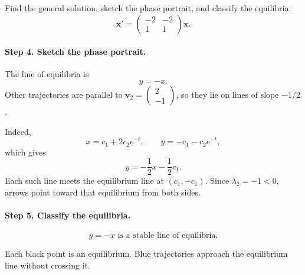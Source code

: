 \documentclass[10pt,letterpaper]{article}
\begin{document}
\begin{example}[5]{
Find the general solution, sketch the phase portrait,
and classify the equilibria:
\[
\mathbf{x}'=
\begin{pmatrix}
-2&-2\\
1&1
\end{pmatrix}\mathbf{x}.
\]
}
\paragraph{Step 4. Sketch the phase portrait.}
The line of equilibria is
\[
y=-x.
\]
Other trajectories are parallel to
$\mathbf{v}_2=\begin{pmatrix}2\\-1\end{pmatrix}$,
so they lie on lines of slope $-1/2$.

Indeed,
\[
x=c_1+2c_2e^{-t},
\qquad
y=-c_1-c_2e^{-t},
\]
which gives
\[
y=-\frac12x-\frac12c_1.
\]
Each such line meets the equilibrium line at
$(c_1,-c_1)$. Since $\lambda_2=-1<0$, arrows point
toward that equilibrium from both sides.

\paragraph{Step 5. Classify the equilibria.}
\[
\boxed{y=-x\text{ is a stable line of equilibria.}}
\]

\begin{center}

\small
Each black point is an equilibrium. Blue trajectories
approach the equilibrium line without crossing it.
\end{center}
\end{example}
\end{document}
